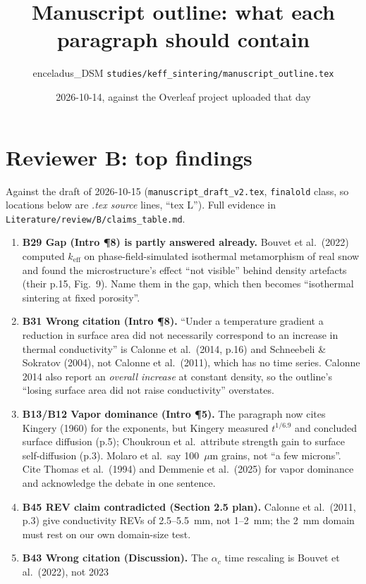 \documentclass[11pt]{article}
\title{Manuscript outline: what each paragraph should contain}
\author{enceladus\_DSM \quad \texttt{studies/keff\_sintering/manuscript\_outline.tex}}
\date{2026-10-14, against the Overleaf project uploaded that day}
\newcommand{\add}[1]{\textcolor{revB}{#1}}
\begin{document}
\maketitle

\section*{\add{Reviewer B: top findings}}
\add{Against the draft of 2026-10-15 (\texttt{manuscript\_draft\_v2.tex}, \texttt{finalold} class, so locations below are
\emph{.tex source} lines, ``tex L''). Full evidence in \texttt{Literature/review/B/claims\_table.md}.}
\begin{enumerate}
\item \add{\textbf{B29 Gap (Intro \P8) is partly answered already.} Bouvet et al.\ (2022) computed $k_{\mathrm{eff}}$ on
  phase-field-simulated isothermal metamorphism of real snow and found the microstructure's effect ``not visible'' behind
  density artefacts (their p.15, Fig.~9). Name them in the gap, which then becomes ``isothermal sintering at fixed porosity''.}
\item \add{\textbf{B31 Wrong citation (Intro \P8).} ``Under a temperature gradient a reduction in surface area did not
  necessarily correspond to an increase in thermal conductivity'' is Calonne et al.\ (2014, p.16) and Schneebeli \&
  Sokratov (2004), not Calonne et al.\ (2011), which has no time series. Calonne 2014 also report an \emph{overall increase} at
  constant density, so the outline's ``losing surface area did not raise conductivity'' overstates.}
\item \add{\textbf{B13/B12 Vapor dominance (Intro \P5).} The paragraph now cites Kingery (1960) for the exponents, but
  Kingery measured $t^{1/6.9}$ and concluded surface diffusion (p.5); Choukroun et al.\ attribute strength gain to surface
  self-diffusion (p.3). Molaro et al.\ say 100~$\mu$m grains, not ``a few microns''. Cite Thomas et al.\ (1994) and Demmenie
  et al.\ (2025) for vapor dominance and acknowledge the debate in one sentence.}
\item \add{\textbf{B45 REV claim contradicted (Section 2.5 plan).} Calonne et al.\ (2011, p.3) give conductivity REVs of
  2.5--5.5~mm, not 1--2~mm; the 2~mm domain must rest on our own domain-size test.}
\item \add{\textbf{B43 Wrong citation (Discussion).} The $\alpha_c$ time rescaling is Bouvet et al.\ (2022), not 2023
}
\end{enumerate}
\end{document}
